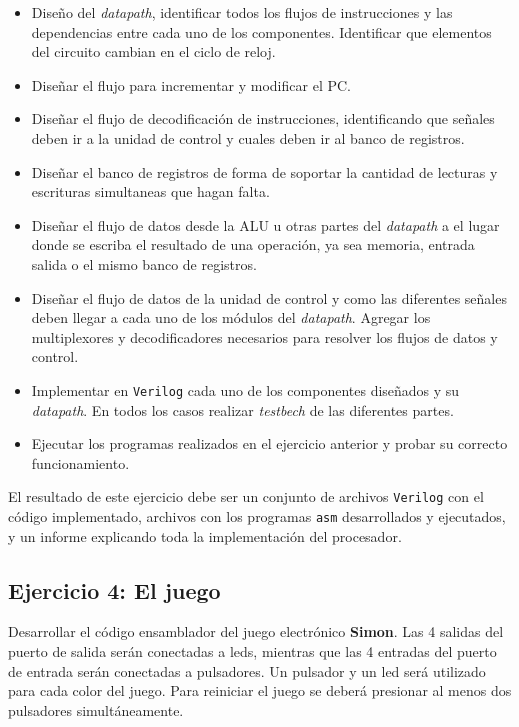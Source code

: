 \documentclass[a4paper,11pt]{article}
\begin{document}
\begin{itemize}
 \item Diseño del \emph{datapath}, identificar todos los flujos de instrucciones y las dependencias entre cada uno de los componentes. Identificar que elementos del circuito cambian en el ciclo de reloj.
 
 \item Diseñar el flujo para incrementar y modificar el PC.
 
 \item Diseñar el flujo de decodificación de instrucciones, identificando que señales deben ir a la unidad de control y cuales deben ir al banco de registros.
 
 \item Diseñar el banco de registros de forma de soportar la cantidad de lecturas y escrituras simultaneas que hagan falta.
 
 \item Diseñar el flujo de datos desde la ALU u otras partes del \emph{datapath} a el lugar donde se escriba el resultado de una operación, ya sea memoria, entrada salida o el mismo banco de registros.
 
 \item Diseñar el flujo de datos de la unidad de control y como las diferentes señales deben llegar a cada uno de los módulos del \emph{datapath}. Agregar los multiplexores y decodificadores necesarios para resolver los flujos de datos y control.
 
\item Implementar en \texttt{Verilog} cada uno de los componentes diseñados y su \emph{datapath}. En todos los casos realizar \emph{testbech} de las diferentes partes.
 
 \item Ejecutar los programas realizados en el ejercicio anterior y probar su correcto funcionamiento.
\end{itemize}

El resultado de este ejercicio debe ser un conjunto de archivos \texttt{Verilog} con el código implementado, archivos con los programas \texttt{asm} desarrollados y ejecutados, y un informe explicando toda la implementación del procesador.

\subsection{Ejercicio 4: El juego}

Desarrollar el código ensamblador del juego electrónico \textbf{Simon}. Las 4 salidas del puerto de salida serán conectadas a leds, mientras que las 4 entradas del puerto de entrada serán conectadas a pulsadores. Un pulsador y un led será utilizado para cada color del juego. Para reiniciar el juego se deberá presionar al menos dos pulsadores simultáneamente.
\end{document}
